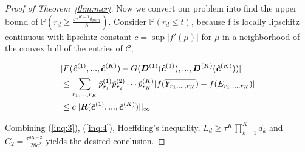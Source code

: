 \documentclass{article}
\begin{document}
\begin{appendices}
\begin{proof}[Proof of Theorem~\ref{thm:mcr}]
Now we convert our problem into find the upper bound of $\mathbb{P}\left(r_d\geq \frac{\varepsilon\tau^{K-1}\delta_{min}}{8}\right)$.
Consider $\mathbb{P}\left(r_d\leq t \right)$, because f is locally lipschitz continuous with lipschitz constant $c = \sup|f'(\mu)|$ for $\mu$ in a neighborhood of the convex hull of the entries of $\mathcal{C}$, 

\begin{equation}\label{inq:4}
\begin{split}
&|F(\hat{\boldsymbol{c}}^{(1)},...,\hat{\boldsymbol{c}}^{(K)})-G(\boldsymbol{D}^{(1)}(\hat{\boldsymbol{c}}^{(1)}),...,\boldsymbol{D}^{(K)}(\hat{\boldsymbol{c}}^{(K)}))|\\
&\leq\sum_{r_1,...,r_K}\hat{p}_{r_1}^{(1)}\hat{p}_{r_2}^{(2)}\cdots\hat{p}_{r_K}^{(K)}|f(\overline{Y_{r_1,...,r_K}})-f(E_{r_1,...,r_K})|\\
&\leq c||\boldsymbol{R}(\hat{\boldsymbol{c}}^{(1)},...,\hat{\boldsymbol{c}}^{(K)})||_\infty
\end{split}
\end{equation}

Combining (\eqref{inq:3}), (\eqref{inq:4}), Hoeffding's inequality, $L_d\geq \tau^K\prod_{k=1}^Kd_k$ and $C_2=\frac{\tau^{3K-2}}{128c^2}$ yields the desired conclusion.


\end{proof}




\end{appendices}
\end{document}
